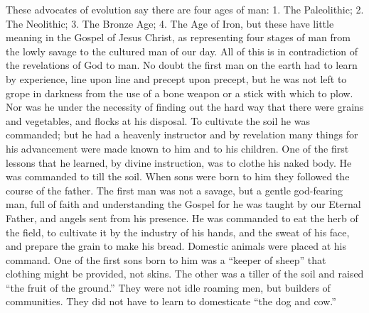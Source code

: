 These advocates of evolution say there are four ages of man: 1. The Paleolithic; 2. The
Neolithic; 3. The Bronze Age; 4. The Age of Iron, but these have little meaning in the Gospel
of Jesus Christ, as representing four stages of man from the lowly savage to the cultured man
of our day. All of this is in contradiction of the revelations of God to man. No doubt the first
man on the earth had to learn by experience, line upon line and precept upon precept, but he
was not left to grope in darkness from the use of a bone weapon or a stick with which to
plow. Nor was he under the necessity of finding out the hard way that there were grains and
vegetables, and flocks at his disposal. To cultivate the soil he was commanded; but he had a
heavenly instructor and by revelation many things for his advancement were made known to
him and to his children. One of the first lessons that he learned, by divine instruction, was to
clothe his naked body. He was commanded to till the soil. When sons were born to him they
followed the course of the father. The first man was not a savage, but a gentle god-fearing
man, full of faith and understanding the Gospel for he was taught by our Eternal Father, and
angels sent from his presence. He was commanded to eat the herb of the field, to cultivate it
by the industry of his hands, and the sweat of his face, and prepare the grain to make his
bread. Domestic animals were placed at his command. One of the first sons born to him was
a ``keeper of sheep'' that clothing might be provided, not skins. The other was a tiller of the
soil and raised ``the fruit of the ground.'' They were not idle roaming men, but builders of
communities. They did not have to learn to domesticate ``the dog and cow.''

